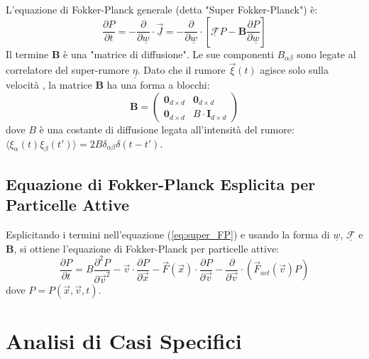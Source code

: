 L'equazione di Fokker-Planck generale (detta "Super Fokker-Planck") è:
\begin{equation}
    \frac{\partial P}{\partial t} = - \frac{\partial}{\partial \underline{w}} \cdot \underline{\vec{J}} = - \frac{\partial}{\partial \underline{w}} \cdot \left[ \underline{\mathcal{F}} P - \mathbf{B} \frac{\partial P}{\partial \underline{w}} \right]
    \label{eq:super_FP}
\end{equation}
Il termine $\mathbf{B}$ è una "matrice di diffusione". Le sue componenti $B_{\alpha\beta}$ sono legate al correlatore del super-rumore $\underline{\eta}$. Dato che il rumore $\vec{\xi}(t)$ agisce solo sulla velocità , la matrice $\mathbf{B}$ ha una forma a blocchi:
\begin{equation}
    \mathbf{B} = 
    \begin{pmatrix}
        \mathbf{0}_{d \times d} & \mathbf{0}_{d \times d} \\
        \mathbf{0}_{d \times d} & B \cdot \mathbf{I}_{d \times d}
    \end{pmatrix}
\end{equation}
dove $B$ è una costante di diffusione legata all'intensità del rumore: \\ $\langle \xi_\alpha(t)\xi_\beta(t') \rangle = 2B \delta_{\alpha\beta}\delta(t-t')$. 

\subsection{Equazione di Fokker-Planck Esplicita per Particelle Attive}
Esplicitando i termini nell'equazione (\ref{eq:super_FP}) e usando la forma di $\underline{w}$, $\underline{\mathcal{F}}$ e $\mathbf{B}$, si ottiene l'equazione di Fokker-Planck per particelle attive:
\begin{equation}
    \frac{\partial P}{\partial t} = B \frac{\partial^2 P}{\partial \vec{v}^2} - \vec{v} \cdot \frac{\partial P}{\partial \vec{x}} - \vec{F}(\vec{x}) \cdot \frac{\partial P}{\partial \vec{v}} - \frac{\partial}{\partial \vec{v}} \cdot \left( \vec{F}_{act}(\vec{v}) P \right)
    \label{eq:FP_attiva}
\end{equation}
dove $P = P(\vec{x}, \vec{v}, t)$.

\section{Analisi di Casi Specifici}

